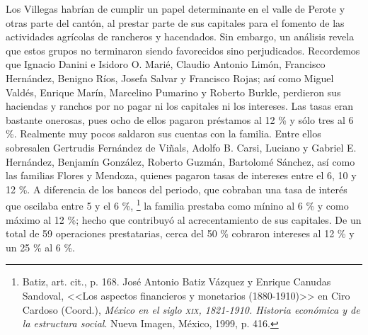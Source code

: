 \documentclass[14pt,twoside,final]{extbook} %
\let\oldfootnote\footnote
\renewcommand\footnote[1]{%
\oldfootnote{\hspace{1mm}#1}}
\begin{document}
Los Villegas habrían de cumplir un papel determinante en el valle de Perote y otras parte del cantón, al prestar parte de sus capitales para el fomento de las actividades agrícolas de rancheros y hacendados. Sin embargo, un análisis revela que estos grupos no terminaron siendo favorecidos sino perjudicados. Recordemos que Ignacio Danini e Isidoro O. Marié, Claudio Antonio Limón, Francisco Hernández, Benigno Ríos, Josefa Salvar y Francisco Rojas; así como Miguel Valdés, Enrique Marín, Marcelino Pumarino y Roberto Burkle, perdieron sus haciendas y ranchos por no pagar ni los capitales ni los intereses. Las tasas eran bastante onerosas, pues ocho de ellos pagaron préstamos al 12 \% y sólo tres al 6 \%. Realmente muy pocos saldaron sus cuentas con la familia. Entre ellos sobresalen Gertrudis Fernández de Viñals, Adolfo B. Carsi, Luciano y Gabriel E. Hernández, Benjamín González, Roberto Guzmán, Bartolomé Sánchez, así como las familias Flores y Mendoza, quienes pagaron tasas de
intereses entre el 6, 10 y 12 \%. A diferencia de los bancos del periodo, que cobraban una tasa de interés que oscilaba entre 5 y el 6 \%,\footnote{Batiz, art. cit., p. 168. José Antonio Batiz Vázquez y Enrique Canudas Sandoval, <<Los aspectos financieros y monetarios (1880-1910)>> en Ciro Cardoso (Coord.), \emph{México en el siglo \textsc{xix}, 1821-1910. Historia económica y de la estructura social}. Nueva Imagen, México, 1999, p. 416.} la familia prestaba como mínino al 6 \% y como máximo al 12 \%; hecho que contribuyó al acrecentamiento de sus capitales. De un total de 59 operaciones prestatarias, cerca del 50 \% cobraron intereses al 12 \% y un 25 \% al 6 \%.
\end{document}

